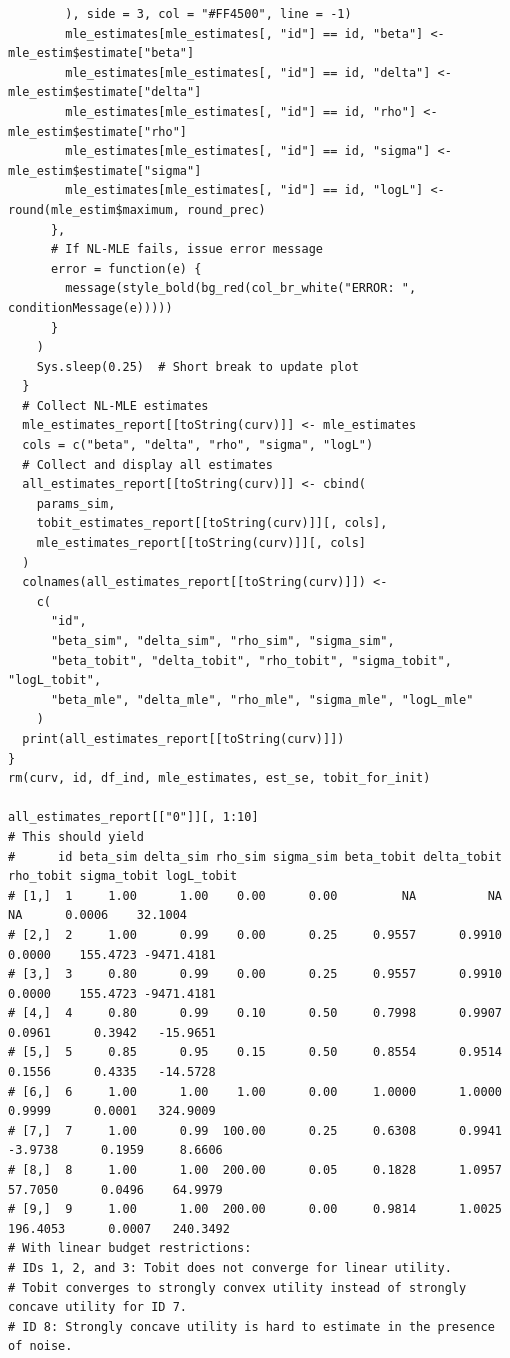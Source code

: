 \begin{lstlisting}
        ), side = 3, col = "#FF4500", line = -1)
        mle_estimates[mle_estimates[, "id"] == id, "beta"] <- mle_estim$estimate["beta"]
        mle_estimates[mle_estimates[, "id"] == id, "delta"] <- mle_estim$estimate["delta"]
        mle_estimates[mle_estimates[, "id"] == id, "rho"] <- mle_estim$estimate["rho"]
        mle_estimates[mle_estimates[, "id"] == id, "sigma"] <- mle_estim$estimate["sigma"]
        mle_estimates[mle_estimates[, "id"] == id, "logL"] <- round(mle_estim$maximum, round_prec)
      },
      # If NL-MLE fails, issue error message
      error = function(e) {
        message(style_bold(bg_red(col_br_white("ERROR: ", conditionMessage(e)))))
      }
    )
    Sys.sleep(0.25)  # Short break to update plot
  }
  # Collect NL-MLE estimates
  mle_estimates_report[[toString(curv)]] <- mle_estimates
  cols = c("beta", "delta", "rho", "sigma", "logL")
  # Collect and display all estimates
  all_estimates_report[[toString(curv)]] <- cbind(
    params_sim,
    tobit_estimates_report[[toString(curv)]][, cols],
    mle_estimates_report[[toString(curv)]][, cols]
  )
  colnames(all_estimates_report[[toString(curv)]]) <-
    c(
      "id",
      "beta_sim", "delta_sim", "rho_sim", "sigma_sim",
      "beta_tobit", "delta_tobit", "rho_tobit", "sigma_tobit", "logL_tobit",
      "beta_mle", "delta_mle", "rho_mle", "sigma_mle", "logL_mle"
    )
  print(all_estimates_report[[toString(curv)]])
}
rm(curv, id, df_ind, mle_estimates, est_se, tobit_for_init)

all_estimates_report[["0"]][, 1:10]
# This should yield
#      id beta_sim delta_sim rho_sim sigma_sim beta_tobit delta_tobit rho_tobit sigma_tobit logL_tobit
# [1,]  1     1.00      1.00    0.00      0.00         NA          NA        NA      0.0006    32.1004
# [2,]  2     1.00      0.99    0.00      0.25     0.9557      0.9910    0.0000    155.4723 -9471.4181
# [3,]  3     0.80      0.99    0.00      0.25     0.9557      0.9910    0.0000    155.4723 -9471.4181
# [4,]  4     0.80      0.99    0.10      0.50     0.7998      0.9907    0.0961      0.3942   -15.9651
# [5,]  5     0.85      0.95    0.15      0.50     0.8554      0.9514    0.1556      0.4335   -14.5728
# [6,]  6     1.00      1.00    1.00      0.00     1.0000      1.0000    0.9999      0.0001   324.9009
# [7,]  7     1.00      0.99  100.00      0.25     0.6308      0.9941   -3.9738      0.1959     8.6606
# [8,]  8     1.00      1.00  200.00      0.05     0.1828      1.0957   57.7050      0.0496    64.9979
# [9,]  9     1.00      1.00  200.00      0.00     0.9814      1.0025  196.4053      0.0007   240.3492
# With linear budget restrictions:
# IDs 1, 2, and 3: Tobit does not converge for linear utility.
# Tobit converges to strongly convex utility instead of strongly concave utility for ID 7.
# ID 8: Strongly concave utility is hard to estimate in the presence of noise.


\end{lstlisting}
